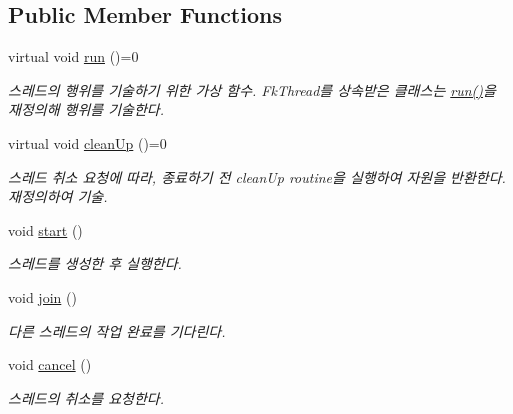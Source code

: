 \subsection*{Public Member Functions}
\begin{DoxyCompactItemize}
\item 
\hypertarget{class_fk_thread_aed0239353fc403d6cfeaab64c1bc17c3}{}virtual void \hyperlink{class_fk_thread_aed0239353fc403d6cfeaab64c1bc17c3}{run} ()=0\label{class_fk_thread_aed0239353fc403d6cfeaab64c1bc17c3}

\begin{DoxyCompactList}\small\item\em 스레드의 행위를 기술하기 위한 가상 함수. Fk\+Thread를 상속받은 클래스는 \hyperlink{class_fk_thread_aed0239353fc403d6cfeaab64c1bc17c3}{run()}을 재정의해 행위를 기술한다. \end{DoxyCompactList}\item 
\hypertarget{class_fk_thread_a38e4c34b4e83e41c379e108fb865d3c2}{}virtual void \hyperlink{class_fk_thread_a38e4c34b4e83e41c379e108fb865d3c2}{clean\+Up} ()=0\label{class_fk_thread_a38e4c34b4e83e41c379e108fb865d3c2}

\begin{DoxyCompactList}\small\item\em 스레드 취소 요청에 따라, 종료하기 전 clean\+Up routine을 실행하여 자원을 반환한다. 재정의하여 기술. \end{DoxyCompactList}\item 
\hypertarget{class_fk_thread_a742e0927a8be5dda5a1b03e33ff3660e}{}void \hyperlink{class_fk_thread_a742e0927a8be5dda5a1b03e33ff3660e}{start} ()\label{class_fk_thread_a742e0927a8be5dda5a1b03e33ff3660e}

\begin{DoxyCompactList}\small\item\em 스레드를 생성한 후 실행한다. \end{DoxyCompactList}\item 
\hypertarget{class_fk_thread_a29d6ec48f16953ba8cce466f81b187f8}{}void \hyperlink{class_fk_thread_a29d6ec48f16953ba8cce466f81b187f8}{join} ()\label{class_fk_thread_a29d6ec48f16953ba8cce466f81b187f8}

\begin{DoxyCompactList}\small\item\em 다른 스레드의 작업 완료를 기다린다. \end{DoxyCompactList}\item 
\hypertarget{class_fk_thread_a3894a97d81e8c18a091564f5a03733c5}{}void \hyperlink{class_fk_thread_a3894a97d81e8c18a091564f5a03733c5}{cancel} ()\label{class_fk_thread_a3894a97d81e8c18a091564f5a03733c5}

\begin{DoxyCompactList}\small\item\em 스레드의 취소를 요청한다. \end{DoxyCompactList}\end{DoxyCompactItemize}
